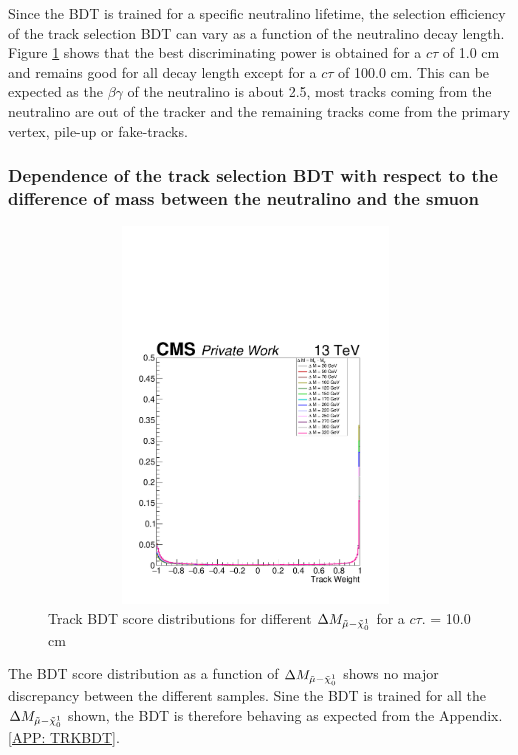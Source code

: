 \documentclass{cernatlasnote}
\begin{document}
\FloatBarrier
Since the BDT is trained for a specific neutralino lifetime, the selection efficiency of the track selection BDT can vary as a function of the neutralino decay length. Figure \ref{fig:BDTctau} shows that the best discriminating power is obtained for a $c\tau$ of 1.0 cm and remains good for all decay length except for a $c\tau$ of 100.0 cm. This can be expected as the $\beta\gamma$ of the neutralino is about 2.5, most tracks coming from the neutralino are out of the tracker and the remaining tracks come from the primary vertex, pile-up or fake-tracks.

\subsubsection{Dependence of the track selection BDT with respect to the difference of mass between the neutralino and the smuon}
   \begin{figure}[ht]
\centering
\includegraphics[height=10cm, width=11cm, trim= 0cm 0cm 0cm 0cm,clip]{images/TRKBDT/plotBDTTRK_dm.pdf}
\caption{\label{fig:BDTctau} Track BDT score distributions for different $\Delta M_{\Tilde{\mu}-\Tilde{\chi}^{1}_{0}}$ for a $c\tau$. = 10.0 cm }
\end{figure}

The BDT score distribution as a function of $\Delta M_{\Tilde{\mu}-\Tilde{\chi}^{1}_{0}}$  shows no major discrepancy between the different samples. Sine the BDT is trained for all the $\Delta M_{\Tilde{\mu}-\Tilde{\chi}^{1}_{0}}$ shown, the BDT is therefore behaving as expected from the Appendix.\ref{APP: TRKBDT}.
\end{document}
